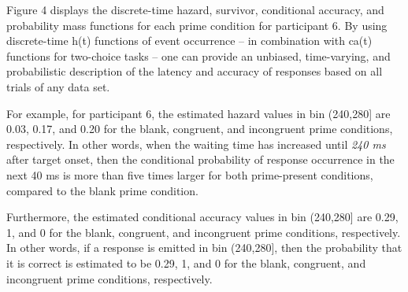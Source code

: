 \documentclass[
  man,floatsintext]{apa6}
\begin{document}
Figure 4 displays the discrete-time hazard, survivor, conditional accuracy, and probability mass functions for each prime condition for participant 6. By using discrete-time h(t) functions of event occurrence -- in combination with ca(t) functions for two-choice tasks -- one can provide an unbiased, time-varying, and probabilistic description of the latency and accuracy of responses based on all trials of any data set.

For example, for participant 6, the estimated hazard values in bin (240,280{]} are 0.03, 0.17, and 0.20 for the blank, congruent, and incongruent prime conditions, respectively. In other words, when the waiting time has increased until \emph{240 ms} after target onset, then the conditional probability of response occurrence in the next 40 ms is more than five times larger for both prime-present conditions, compared to the blank prime condition.

Furthermore, the estimated conditional accuracy values in bin (240,280{]} are 0.29, 1, and 0 for the blank, congruent, and incongruent prime conditions, respectively. In other words, if a response is emitted in bin (240,280{]}, then the probability that it is correct is estimated to be 0.29, 1, and 0 for the blank, congruent, and incongruent prime conditions, respectively.
\end{document}
